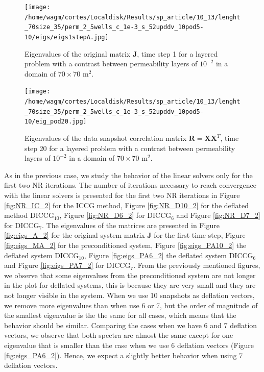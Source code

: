 \documentclass[12pt]{article}
\begin{document}
\begin{figure}[!h]
\centering
\begin{minipage}{.4\textwidth}
 \centering
 \vspace{-3mm}
\texttt{[image: /home/wagm/cortes/Localdisk/Results/sp\_article/10\_13/lenght\_70size\_35/perm\_2\_5wells\_c\_1e-3\_s\_52upddv\_10pod5-10/eigs/eigs1stepA.jpg]}
 \vspace{-10pt}
\caption{Eigenvalues of the original matrix $\mathbf{J}$, time step 1 for a layered problem with a contrast between permeability layers of $10^{-2}$ in a domain of $70 \times 70$ m$^2$.}\label{fig:eigs_A_2}
\end{minipage}%
\hspace{1cm}
\begin{minipage}{.4\textwidth}
 \centering
\texttt{[image: /home/wagm/cortes/Localdisk/Results/sp\_article/10\_13/lenght\_70size\_35/perm\_2\_5wells\_c\_1e-3\_s\_52upddv\_10pod5-10/eig\_pod20.jpg]}
\vspace{-5mm}
\caption{Eigenvalues of the data snapshot correlation matrix $\mathbf{R}=\mathbf{X}\mathbf{X}^T$, time step 20 for a layered problem with a contrast between permeability layers of $10^{-2}$ in a domain of $70 \times 70$ m$^2$.}
\label{fig:eig_POD_2}
\end{minipage}
\end{figure}
As in the previous case, we study the behavior of the linear solvers only for the first two NR iterations. 
The number of iterations necessary to reach convergence with the linear solvers is presented for the first two 
NR iterations in Figure \ref{fig:NR_IC_2} for the ICCG method, Figure \ref{fig:NR_D10_2} for the deflated method 
DICCG$_{10}$, Figure \ref{fig:NR_D6_2} for DICCG$_6$ and Figure \ref{fig:NR_D7_2} for DICCG$_7$.
The eigenvalues of the matrices are presented in Figure \ref{fig:eigs_A_2} for the original system matrix $\mathbf{J}$ 
for the first time step, Figure \ref{fig:eigs_MA_2} for the preconditioned system,  Figure \ref{fig:eigs_PA10_2} 
the deflated system DICCG$_{10}$, Figure \ref{fig:eigs_PA6_2} the deflated system DICCG$_6$ and Figure 
\ref{fig:eigs_PA7_2} for DICCG$_7$. From the previously mentioned figures, we observe that some eigenvalues from 
the preconditioned system are not longer in the plot for deflated systems, this is because they are very small and 
they are not longer visible in the system. When we use 10 snapshots as deflation vectors, we remove more eigenvalues 
than when use 6 or 7, but the order of magnitude of the smallest eigenvalue is the the same for all cases, which 
means that the behavior should be similar. Comparing the cases when we have 6 and 7 deflation vectors, we observe 
that both spectra are almost the same except for one eigenvalue that is smaller than the case when we 
use 6 deflation vectors (Figure \ref{fig:eigs_PA6_2}). Hence, we expect a slightly better behavior when using 7 
deflation vectors. \\
\end{document}
